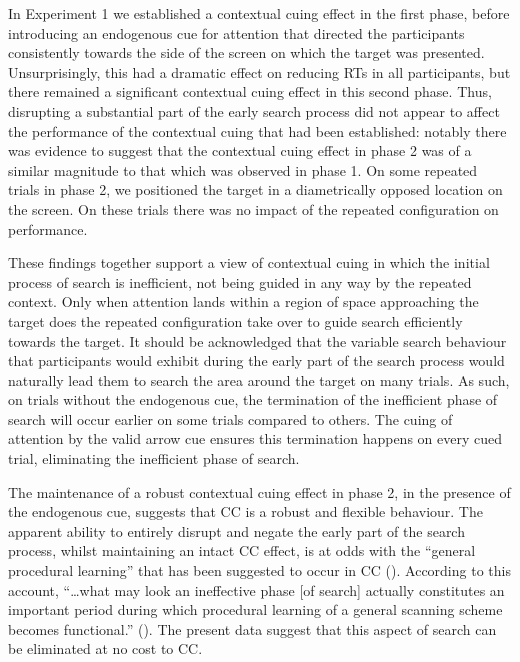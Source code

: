 \documentclass[
  man,
  floatsintext,
  longtable,
  nolmodern,
  notxfonts,
  notimes,
  colorlinks=true,linkcolor=blue,citecolor=blue,urlcolor=blue]{apa7}
\begin{document}
In Experiment 1 we established a contextual cuing effect in the first
phase, before introducing an endogenous cue for attention that directed
the participants consistently towards the side of the screen on which
the target was presented. Unsurprisingly, this had a dramatic effect on
reducing RTs in all participants, but there remained a significant
contextual cuing effect in this second phase. Thus, disrupting a
substantial part of the early search process did not appear to affect
the performance of the contextual cuing that had been established:
notably there was evidence to suggest that the contextual cuing effect
in phase 2 was of a similar magnitude to that which was observed in
phase 1. On some repeated trials in phase 2, we positioned the target in
a diametrically opposed location on the screen. On these trials there
was no impact of the repeated configuration on performance.

These findings together support a view of contextual cuing in which the
initial process of search is inefficient, not being guided in any way by
the repeated context. Only when attention lands within a region of space
approaching the target does the repeated configuration take over to
guide search efficiently towards the target. It should be acknowledged
that the variable search behaviour that participants would exhibit
during the early part of the search process would naturally lead them to
search the area around the target on many trials. As such, on trials
without the endogenous cue, the termination of the inefficient phase of
search will occur earlier on some trials compared to others. The cuing
of attention by the valid arrow cue ensures this termination happens on
every cued trial, eliminating the inefficient phase of search.

The maintenance of a robust contextual cuing effect in phase 2, in the
presence of the endogenous cue, suggests that CC is a robust and
flexible behaviour. The apparent ability to entirely disrupt and negate
the early part of the search process, whilst maintaining an intact CC
effect, is at odds with the ``general procedural learning'' that has
been suggested to occur in CC (). According to this account, ``\ldots what may look an ineffective
phase {[}of search{]} actually constitutes an important period during
which procedural learning of a general scanning scheme becomes
functional.'' (). The
present data suggest that this aspect of search can be eliminated at no
cost to CC.
\end{document}
